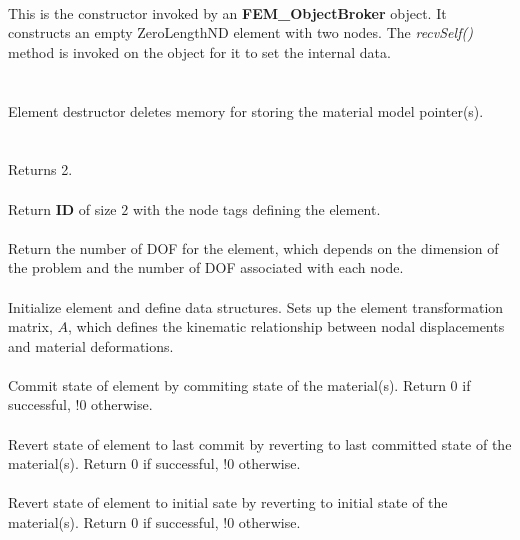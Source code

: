  \\ 
This is the constructor invoked by an {\bf FEM\_ObjectBroker} object. It
constructs an empty ZeroLengthND element with two nodes.
The {\em recvSelf()} method is
invoked on the object for it to set the internal data. 
\\

 \\
 \\ 
Element destructor deletes memory for storing the material model pointer(s). 
\\

  \\
 \\
Returns 2.
\\

 \\
Return {\bf ID} of size $2$ with the node tags defining the element.
\\

 \\	
Return the number of DOF for the element, which depends on the dimension of the problem
and the number of DOF associated with each node.
\\

 \\
Initialize element and define data structures.  Sets up the element
transformation matrix, $A$, which defines the kinematic relationship between
nodal displacements and material deformations.
\\

 \\
Commit state of element by commiting state of the material(s).
Return 0 if successful, !0 otherwise.
\\

 \\        
Revert state of element to last commit by reverting to last committed state of the material(s).
Return 0 if successful, !0 otherwise.
\\

 \\        
Revert state of element to initial sate by reverting to initial state of the material(s).
Return 0 if successful, !0 otherwise.
\\

